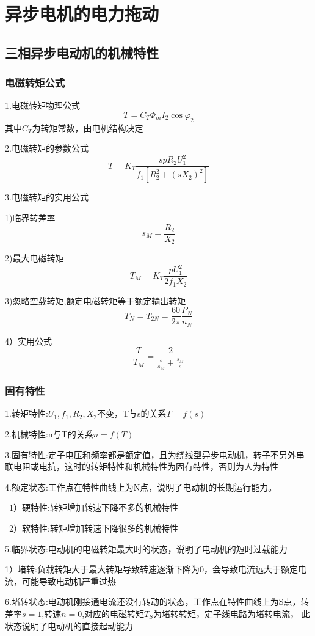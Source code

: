 \documentclass[11pt,twoside,a4paper]{ctexart}
\begin{document}
    
\section{异步电机的电力拖动}

\subsection{三相异步电动机的机械特性}

\subsubsection{电磁转矩公式}

1.电磁转矩物理公式
\[T = C_T\varPhi _m I_2 \cos \varphi _2\]
其中$C_T$为转矩常数，由电机结构决定

2.电磁转矩的参数公式
\[T = K_T\frac{spR_2U_1^2}{f_1[R_2^2 + (sX_2)^2]}\]

3.电磁转矩的实用公式

1)临界转差率
\[s_M = \frac{R_2}{X_2}\]

2)最大电磁转矩
\[T_M = K_T\frac{pU_1^2}{2f_1X_2}\]

3)忽略空载转矩,额定电磁转矩等于额定输出转矩
\[T_N = T_{2N} = \frac{60}{2\pi}\frac{P_N}{n_N}\]

4）实用公式
\[\frac{T}{T_M} = \frac{2}{\frac{s}{s_M} + \frac{s_M}{s}}\]

\subsubsection{固有特性}

1.转矩特性:$U_1,f_1,R_2,X_2$不变，T与s的关系$T = f(s)$

2.机械特性:n与T的关系$n = f(T)$

3.固有特性:定子电压和频率都是额定值，且为绕线型异步电动机，转子不另外串联电阻或电抗，这时的转矩特性和机械特性为固有特性，否则为人为特性

4.额定状态:工作点在特性曲线上为N点，说明了电动机的长期运行能力。

\ 1）硬特性:转矩增加转速下降不多的机械特性

\ 2）软特性:转矩增加转速下降很多的机械特性

5.临界状态:电动机的电磁转矩最大时的状态，说明了电动机的短时过载能力

1）堵转:负载转矩大于最大转矩导致转速逐渐下降为0，会导致电流远大于额定电流，可能导致电动机严重过热

6.堵转状态:电动机刚接通电流还没有转动的状态，工作点在特性曲线上为S点，转差率$s = 1$,转速$n = 0$,对应的电磁转矩$T_S$为堵转转矩，定子线电路为堵转电流，
此状态说明了电动机的直接起动能力
\end{document}
